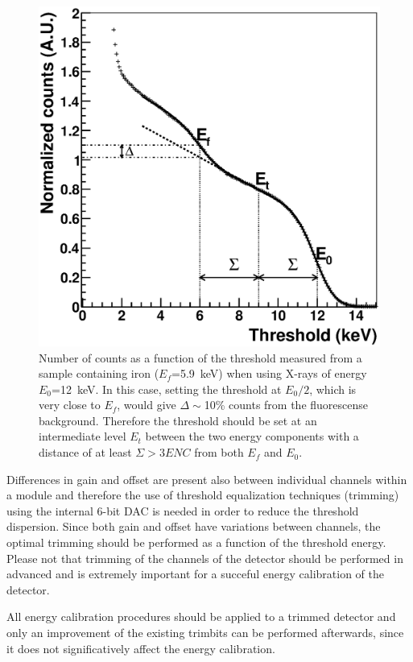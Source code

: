 \begin{figure}
\caption{Number of counts as a function of the threshold measured from a sample containing iron ($E_f$=5.9~keV) when using X-rays of energy $E_0$=12~keV. In this case, setting the threshold at $E_0/2$, which is very close to $E_f$, would give $\Delta \sim$10\% counts from the fluorescense background. Therefore the threshold should be set at an intermediate level $E_t$ between the two energy components with a distance of at least $\Sigma>3ENC$  from both $E_f$ and $E_0$.}\label{fig:thrscanfluo}
\includegraphics[width=\textwidth]{fig7.eps}
\end{figure}
Differences in gain and offset are present also between individual channels within a module and therefore the use of threshold equalization techniques (trimming) using the internal 6-bit DAC is needed in order to reduce the threshold dispersion.
Since both gain and offset have variations between channels, the optimal trimming should be performed as a function of the threshold energy.
Please not that trimming of the channels of the detector should be performed in advanced and is extremely important for a succeful energy calibration of the detector.

All energy calibration procedures should be applied to a trimmed detector and only an improvement of the existing trimbits can be performed afterwards, since it does not significatively affect the energy calibration.


